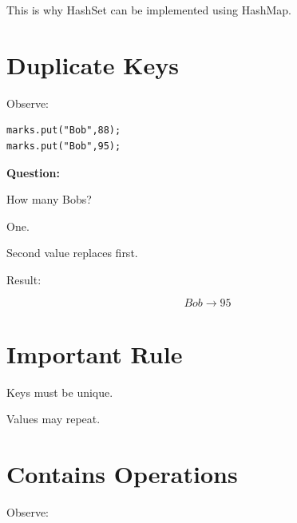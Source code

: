 \documentclass[11pt,a4paper]{book}
\begin{document}

This is why HashSet can be
implemented using HashMap.


\section{Duplicate Keys}

Observe:

\begin{verbatim} 
marks.put("Bob",88);
marks.put("Bob",95);
\end{verbatim}


\textbf{Question:}

How many Bobs?


One.


Second value replaces first.


Result:

\[
Bob
\rightarrow
95
\]


\section{Important Rule}

\begin{rosettarule}

Keys must be unique.

\end{rosettarule}


Values may repeat.


\section{Contains Operations}

Observe:
\end{document}
